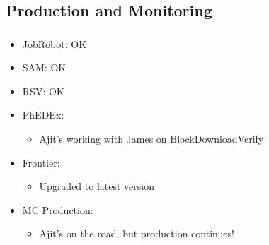 \documentclass{beamer}
\begin{document}
\subsection{Production and Monitoring}
\begin{frame}
\frametitle{}
\begin{itemize}
     \item JobRobot: OK
     \item SAM: OK
     \item RSV: OK
     \item PhEDEx:
     \begin{itemize}
        \item Ajit's working with James on BlockDownloadVerify
     \end{itemize}
     \item Frontier:
     \begin{itemize}
        \item Upgraded to latest version
    \end{itemize}
     \item MC Production:
     \begin{itemize}
        \item Ajit's on the road, but production continues!
     \end{itemize}
\end{itemize}
\end{frame}
\end{document}

